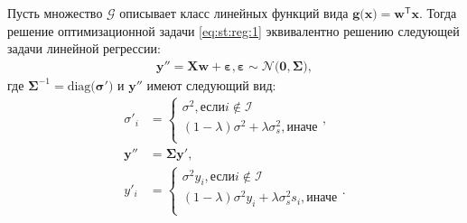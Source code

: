 \begin{theorem}
\label{theorem:st:reg}
Пусть множество $\mathcal{G}$ описывает класс линейных функций вида $\mathbf{g}\bigr(\mathbf{x}\bigr) = \mathbf{w}^{\mathsf{T}}\mathbf{x}.$ Тогда решение оптимизационной задачи \eqref{eq:st:reg:1} эквивалентно решению следующей задачи линейной регрессии:
\[
\label{eq:st:reg:th:st:1}
\begin{aligned}
\mathbf{y''} = \mathbf{X}\mathbf{w} + \bm{\varepsilon}, \bm{\varepsilon} \sim \mathcal{N}\bigr(\mathbf{0}, \bm{\Sigma}\bigr),
\end{aligned}
\]
где $\bm{\Sigma}^{-1}=\text{diag}\bigr(\bm{\sigma'}\bigr)$ и $\mathbf{y''}$ имеют следующий вид:
\[
\label{eq:st:reg:th:st:2}
\begin{aligned}
\sigma'_{i} &= \begin{cases}
\sigma^2, \text{если} i \not \in \mathcal{I}\\
\left(1-\lambda\right)\sigma^2+\lambda\sigma_s^2, \text{иначе}\\
\end{cases}, \\
\mathbf{y''} &= \bm{\Sigma}\mathbf{y'},\\
y'_i &= \begin{cases}
\sigma^2y_i, \text{если} i \not \in \mathcal{I}\\
\left(1-\lambda\right)\sigma^2y_i+\lambda\sigma_s^2s_i, \text{иначе}\\
\end{cases}.
\end{aligned}
\]
\end{theorem}
